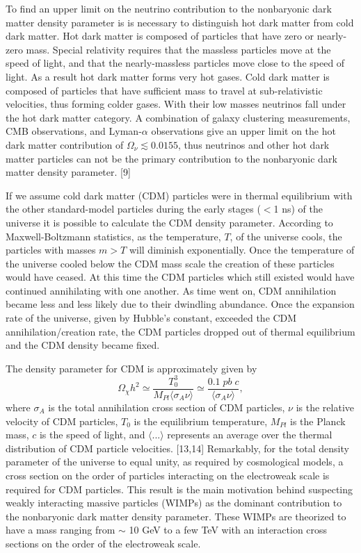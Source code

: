 \documentclass[a4paper,12pt]{article}
\begin{document}
To find an upper limit on the neutrino contribution to the nonbaryonic dark matter density parameter is is necessary to distinguish hot dark matter from cold dark matter.  Hot dark matter is composed of particles that have zero or nearly-zero mass.  Special relativity requires that the massless particles move at the speed of light, and that the nearly-massless particles move close to the speed of light.  As a result hot dark matter forms very hot gases.  Cold dark matter is composed of particles that have sufficient mass to travel at sub-relativistic velocities, thus forming colder gases.  With their low masses neutrinos fall under the hot dark matter category.  A combination of galaxy clustering measurements, CMB observations, and Lyman-$\alpha$ observations give an upper limit on the hot dark matter contribution of $\Omega_\nu \lesssim 0.0155$, thus neutrinos and other hot dark matter particles can not be the primary contribution to the nonbaryonic dark matter density parameter. [9]

If we assume cold dark matter (CDM) particles were in thermal equilibrium with the other standard-model particles during the early stages ($<$1 ns) of the universe it is possible to calculate the CDM density parameter.  According to Maxwell-Boltzmann statistics, as the temperature, $T$, of the universe cools, the particles with masses $m > T$ will diminish exponentially.  Once the temperature of the universe cooled below the CDM mass scale the creation of these particles would have ceased.  At this time the CDM particles which still existed would have continued annihilating with one another.  As time went on, CDM annihilation became less and less likely due to their dwindling abundance.  Once the expansion rate of the universe, given by Hubble's constant, exceeded the CDM annihilation/creation rate, the CDM particles dropped out of thermal equilibrium and the CDM density became fixed.  

The density parameter for CDM is approximately given by
\[\Omega_\chi h^2 \simeq \frac{T_0^3}{M_{Pl} \langle \sigma_A \nu \rangle} \simeq \frac{0.1 \; pb \; c}{\langle \sigma_A \nu \rangle}, \]
where $\sigma_A$ is the total annihilation cross section of CDM particles, $\nu$ is the relative velocity of CDM particles, $T_0$ is the equilibrium temperature, $M_{Pl}$ is the Planck mass, $c$ is the speed of light, and $\langle ... \rangle$ represents an average over the thermal distribution of CDM particle velocities. [13,14] Remarkably, for the total density parameter of the universe to equal unity, as required by cosmological models, a cross section on the order of particles interacting on the electroweak scale is required for CDM particles. This result is the main motivation behind suspecting weakly interacting massive particles (WIMPs) as the dominant contribution to the nonbaryonic dark matter density parameter.  These WIMPs are theorized to have a mass ranging from $\sim$ 10 GeV to a few TeV with an interaction cross sections on the order of the electroweak scale.  
\end{document}
